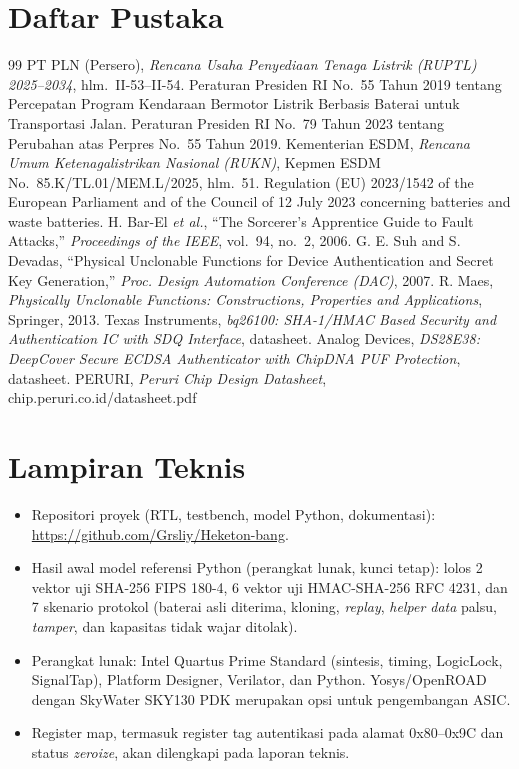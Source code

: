 \documentclass[11pt,a4paper]{article}
\begin{document}
\section*{Daftar Pustaka}
\vspace{-14pt}
\begin{thebibliography}{99}\small
{} PT PLN (Persero), \emph{Rencana Usaha Penyediaan Tenaga Listrik (RUPTL) 2025--2034}, hlm.~II-53--II-54.
 Peraturan Presiden RI No.~55 Tahun 2019 tentang Percepatan Program Kendaraan Bermotor Listrik Berbasis Baterai untuk Transportasi Jalan.
 Peraturan Presiden RI No.~79 Tahun 2023 tentang Perubahan atas Perpres No.~55 Tahun 2019.
 Kementerian ESDM, \emph{Rencana Umum Ketenagalistrikan Nasional (RUKN)}, Kepmen ESDM No.~85.K/TL.01/MEM.L/2025, hlm.~51.
 Regulation (EU) 2023/1542 of the European Parliament and of the Council of 12 July 2023 concerning batteries and waste batteries.
 H. Bar-El \emph{et al.}, ``The Sorcerer's Apprentice Guide to Fault Attacks,'' \emph{Proceedings of the IEEE}, vol.~94, no.~2, 2006.
 G. E. Suh and S. Devadas, ``Physical Unclonable Functions for Device Authentication and Secret Key Generation,'' \emph{Proc. Design Automation Conference (DAC)}, 2007.
 R. Maes, \emph{Physically Unclonable Functions: Constructions, Properties and Applications}, Springer, 2013.
 Texas Instruments, \emph{bq26100: SHA-1/HMAC Based Security and Authentication IC with SDQ Interface}, datasheet.
 Analog Devices, \emph{DS28E38: DeepCover Secure ECDSA Authenticator with ChipDNA PUF Protection}, datasheet.
 PERURI, \emph{Peruri Chip Design Datasheet}, chip.peruri.co.id/datasheet.pdf
\end{thebibliography}

\clearpage
\section*{Lampiran Teknis}

\begin{itemize}
  \item Repositori proyek (RTL, testbench, model Python, dokumentasi): \url{https://github.com/Grsliy/Heketon-bang}.
  \item Hasil awal model referensi Python (perangkat lunak, kunci tetap): lolos 2 vektor uji SHA-256 FIPS 180-4, 6 vektor uji HMAC-SHA-256 RFC 4231, dan 7 skenario protokol (baterai asli diterima, kloning, \emph{replay}, \emph{helper data} palsu, \emph{tamper}, dan kapasitas tidak wajar ditolak).
  \item Perangkat lunak: Intel Quartus Prime Standard (sintesis, timing, LogicLock, SignalTap), Platform Designer, Verilator, dan Python. Yosys/OpenROAD dengan SkyWater SKY130 PDK merupakan opsi untuk pengembangan ASIC.
  \item Register map, termasuk register tag autentikasi pada alamat 0x80--0x9C dan status \emph{zeroize}, akan dilengkapi pada laporan teknis.
\end{itemize}
\end{document}
